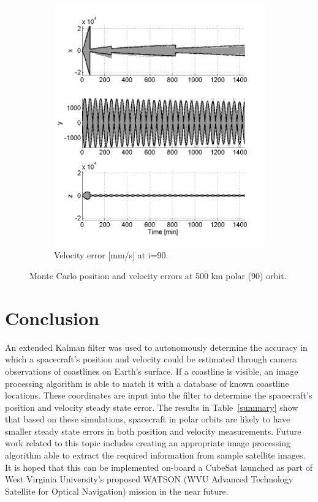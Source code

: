 \documentclass[]{aiaa-tc}%
\begin{document}
\begin{figure}[h!]
\begin{subfigure}{.49\textwidth}
		\includegraphics{MC_vel90_500}
		\caption{Velocity error [mm/s] at i=90\degree.}
		\label{fig:mcvel90_500}
	\end{subfigure}
	\caption{Monte Carlo position and velocity errors at 500 km polar (90\degree) orbit.}
	\label{fig:mc90_500}
\end{figure}
%
\section{Conclusion}
An extended Kalman filter was used to autonomously determine the accuracy in which a spacecraft's position and velocity could be estimated through camera observations of coastlines on Earth's surface.  If a coastline is visible, an image processing algorithm is able to match it with a database of known coastline locations.  These coordinates are input into the filter to determine the spacecraft's position and velocity steady state error.  The results in Table~\ref{summary} show that based on these simulations, spacecraft in polar orbits are likely to have smaller steady state errors in both position and velocity measurements.  Future work related to this topic includes creating an appropriate image processing algorithm able to extract the required information from sample satellite images.  It is hoped that this can be implemented on-board a CubeSat launched as part of West Virginia University's proposed WATSON (WVU Advanced Technology Satellite for Optical Navigation) mission in the near future.
%
\clearpage
\end{document}
